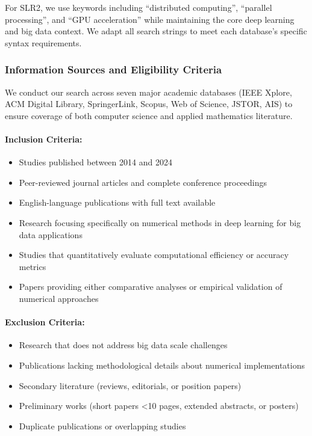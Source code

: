 \documentclass[acmsmall]{acmart}
\begin{document}
For SLR2, we use keywords including ``distributed computing'', ``parallel processing'', and ``GPU acceleration'' while maintaining the core deep learning and big data context. We adapt all search strings to meet each database's specific syntax requirements.

\subsubsection{Information Sources and Eligibility Criteria}\label{subsubsec:phase-1-planning-and-protocol-development:information-sources-and-eligibility-criteria}
We conduct our search across seven major academic databases (IEEE Xplore, ACM Digital Library, SpringerLink, Scopus, Web of Science, JSTOR, AIS) to ensure coverage of both computer science and applied mathematics literature.

\noindent\paragraph{Inclusion Criteria:}
\begin{itemize}
    \item Studies published between 2014 and 2024
    \item Peer-reviewed journal articles and complete conference proceedings
    \item English-language publications with full text available
    \item Research focusing specifically on numerical methods in deep learning for big data applications
    \item Studies that quantitatively evaluate computational efficiency or accuracy metrics
    \item Papers providing either comparative analyses or empirical validation of numerical approaches
\end{itemize}

\noindent\paragraph{Exclusion Criteria:}
\begin{itemize}
    \item Research that does not address big data scale challenges
    \item Publications lacking methodological details about numerical implementations
    \item Secondary literature (reviews, editorials, or position papers)
    \item Preliminary works (short papers <10 pages, extended abstracts, or posters)
    \item Duplicate publications or overlapping studies
\end{itemize}
\end{document}
